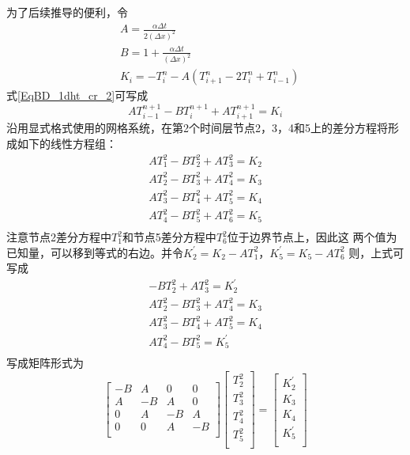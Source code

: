 为了后续推导的便利，令
\begin{equation}
\begin{aligned}
  &A = \frac{\alpha\Delta t}{2(\Delta x)^{2}} \\
  &B = 1 + \frac{\alpha\Delta t}{(\Delta x)^{2}} \\
  &K_{i} = 
  -T_{i}^{n}
  -
  A(T_{i+1}^{n} - 2T_{i}^{n} + T_{i-1}^{n})
\end{aligned}
\end{equation}
式\eqref{EqBD_1dht_cr_2}可写成
\begin{equation}
  AT_{i-1}^{n+1} - BT_{i}^{n+1} + AT_{i+1}^{n+1} = K_{i}
  \label{EqBD_1dht_ia}
\end{equation}
沿用显式格式使用的网格系统，在第2个时间层节点2，3，4和5上的差分方程将形成如下的线性方程组：
\begin{equation}
\begin{aligned}
  AT_{1}^{2}-BT_{2}^{2}+AT_{3}^{2} = K_{2} \\
  AT_{2}^{2}-BT_{3}^{2}+AT_{4}^{2} = K_{3} \\
  AT_{3}^{2}-BT_{4}^{2}+AT_{5}^{2} = K_{4} \\
  AT_{4}^{2}-BT_{5}^{2}+AT_{6}^{2} = K_{5} \\
\end{aligned}
\end{equation}
注意节点2差分方程中$T_{1}^{2}$和节点5差分方程中$T_{6}^{2}$位于边界节点上，因此这
两个值为已知量，可以移到等式的右边。并令$K_{2}^{\prime}=K_{2} - AT_{1}^{2}$，$K_{5}^{\prime}=K_{5} - AT_{6}^{2}$ 则，上式可写成
\begin{equation}
\begin{aligned}
  -BT_{2}^{2}+AT_{3}^{2} = K_{2}^{\prime}\\
  AT_{2}^{2}-BT_{3}^{2}+AT_{4}^{2} = K_{3} \\
  AT_{3}^{2}-BT_{4}^{2}+AT_{5}^{2} = K_{4} \\
  AT_{4}^{2}-BT_{5}^{2} = K_{5}^{\prime}\\
\end{aligned}
\end{equation}
写成矩阵形式为
\begin{equation}
  \begin{bmatrix}
    -B & A & 0 & 0 \\
    A & -B & A & 0 \\
    0 & A & -B & A \\
    0 & 0 & A & -B \\
  \end{bmatrix}
  \begin{bmatrix}
    T_{2}^{2} \\
    T_{3}^{2} \\
    T_{4}^{2} \\
    T_{5}^{2} \\
  \end{bmatrix}
  =
  \begin{bmatrix}
    K_{2}^{\prime} \\
    K_{3} \\
    K_{4} \\
    K_{5}^{\prime} \\
  \end{bmatrix}
\end{equation}

